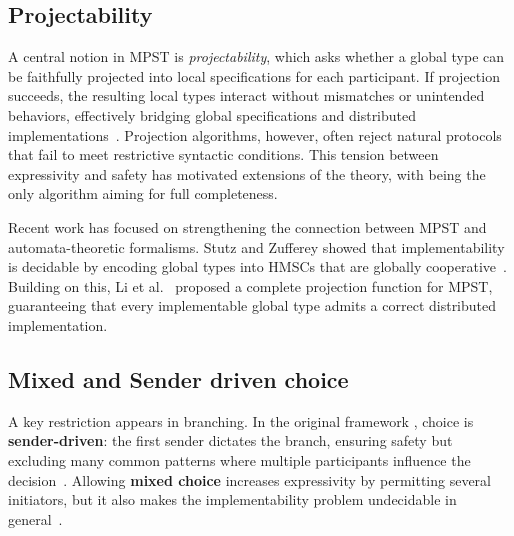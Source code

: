 
\subsection{Projectability}
A central notion in MPST is \emph{projectability}, which asks whether 
a global type can be faithfully projected into local specifications for 
each participant. If projection succeeds, the resulting local types 
interact without mismatches or unintended behaviors, effectively 
bridging global specifications and distributed implementations~\cite{honda2008multiparty}.  
Projection algorithms, however, often reject natural protocols that 
fail to meet restrictive syntactic conditions. This tension between 
expressivity and safety has motivated extensions of the theory, with 
\cite{castagna2012global} being the only algorithm aiming for full 
completeness.

Recent work has focused on strengthening the connection between MPST 
and automata-theoretic formalisms. Stutz and Zufferey 
showed that implementability is decidable by encoding global types 
into HMSCs that are globally cooperative~\cite{stutz2022comparing,stutz2023asynchronous}. 
Building on this, Li et al.~\cite{li2023complete} proposed a complete 
projection function for MPST, guaranteeing that every implementable 
global type admits a correct distributed implementation.

\subsection{Mixed and Sender driven choice}
A key restriction appears in branching. In the original framework \cite{honda2008multiparty,carbone2012structured}, 
choice is \textbf{sender-driven}: the first sender dictates the branch, 
ensuring safety but excluding many common patterns where multiple 
participants influence the decision~\cite{carbone2012structured}.  
Allowing \textbf{mixed choice} increases expressivity by permitting 
several initiators, but it also makes the implementability problem 
undecidable in general~\cite{barbanera2020choreography}.  

